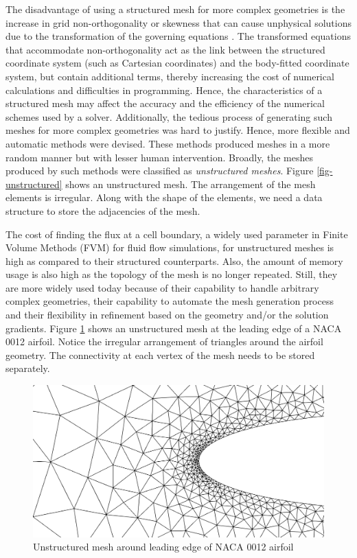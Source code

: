 The disadvantage of using a structured mesh for more complex geometries is the increase in grid non-orthogonality or skewness that can cause unphysical solutions due to the transformation of the governing equations \cite{TU2013219}. The transformed equations that accommodate non-orthogonality act as the link between the structured coordinate system (such as Cartesian coordinates) and the body-fitted coordinate system, but contain additional terms, thereby increasing the cost of numerical calculations and difficulties in programming. Hence, the characteristics of a structured mesh may affect the accuracy and the efficiency of the numerical schemes used by a solver. Additionally, the tedious process of generating such meshes for more complex geometries was hard to justify. Hence, more flexible and automatic methods were devised. These methods produced meshes in a more random manner but with lesser human intervention. Broadly, the meshes produced by such methods were classified as \textit{unstructured meshes}. Figure \ref{fig-unstructured} shows an unstructured mesh. The arrangement of the mesh elements is irregular. Along with the shape of the elements, we need a data structure to store the adjacencies of the mesh.

The cost of finding the flux at a cell boundary, a widely used parameter in Finite Volume Methods (FVM) for fluid flow simulations, for unstructured meshes is high as compared to their structured counterparts. Also, the amount of memory usage is also high as the topology of the mesh is no longer repeated. Still, they are more widely used today because of their capability to handle arbitrary complex geometries, their capability to automate the mesh generation process and their flexibility in refinement based on the geometry and/or the solution gradients. Figure \ref{fig-unstructuredNaca0012} shows an unstructured mesh at the leading edge of a NACA 0012 airfoil. Notice the irregular arrangement of triangles around the airfoil geometry. The connectivity at each vertex of the mesh needs to be stored separately.

\begin{figure}
  \centering
  \includegraphics[width=0.8\linewidth]{img/intro/unstructuredNaca0012.png}
  \caption{Unstructured mesh around leading edge of NACA 0012 airfoil}
  \label{fig-unstructuredNaca0012}
\end{figure}

